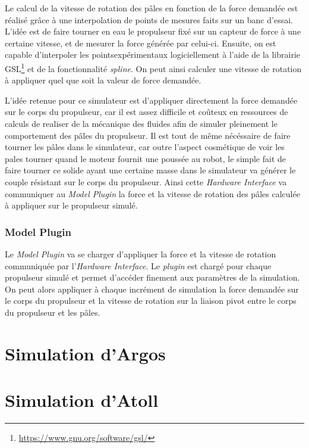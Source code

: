 				Le calcul de la vitesse de rotation des pâles en fonction de la force demandée est réalisé grâce à une interpolation de points de mesures faits sur un banc d'essai. L'idée est de faire tourner en eau le propulseur fixé sur un capteur de force à une certaine vitesse, et de mesurer la force générée par celui-ci. Ensuite, on est capable d'interpoler les pointsexpérimentaux logiciellement à l'aide de la librairie \gls{GSL}\footnote{\url{https://www.gnu.org/software/gsl/}} et de la fonctionnalité \textit{spline}. On peut ainsi calculer une vitesse de rotation à appliquer quel que soit la valeur de force demandée.
				
				L'idée retenue pour ce simulateur est d'appliquer directement la force demandée sur le corps du propulseur, car il est assez difficile et coûteux en ressources de calculs de realiser de la mécanique des fluides afin de simuler pleinement le comportement des pâles du propulseur. Il est tout de même nécéssaire de faire tourner les pâles dans le simulateur, car outre l'aspect cosmétique de voir les pales tourner quand le moteur fournit une poussée au robot, le simple fait de faire tourner ce solide ayant une certaine masse dans le simulateur va générer le couple résistant sur le corps du propulseur. Ainsi cette \textit{Hardware Interface} va communiquer au \textit{Model Plugin} la force et la vitesse de rotation des pâles calculée à appliquer sur le propulseur simulé.
	
			\subsubsection{Model Plugin}

				Le \textit{Model Plugin} va se charger d'appliquer la force et la vitesse de rotation communiquée par l'\textit{Hardware Interface}. Le \textit{plugin} est chargé pour chaque propulseur simulé et permet d'accéder finement aux paramètres de la simulation. On peut alors appliquer à chaque incrément de simulation la force demandée sur le corps du propulseur et la vitesse de rotation sur la liaison pivot entre le corps du propulseur et les pâles.
				

	\section{Simulation d'Argos}

	\section{Simulation d'Atoll}